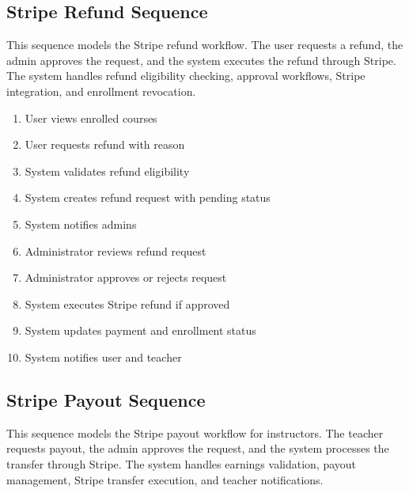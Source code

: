 
\subsection{Stripe Refund Sequence}
This sequence models the Stripe refund workflow. The user requests a refund,
the admin approves the request, and the system executes the refund through
Stripe. The system handles refund eligibility checking, approval workflows,
Stripe integration, and enrollment revocation.

\begin{enumerate}[topsep=0pt,itemsep=1pt,parsep=0pt,partopsep=0pt]
    \item User views enrolled courses
    \item User requests refund with reason
    \item System validates refund eligibility
    \item System creates refund request with pending status
    \item System notifies admins
    \item Administrator reviews refund request
    \item Administrator approves or rejects request
    \item System executes Stripe refund if approved
    \item System updates payment and enrollment status
    \item System notifies user and teacher
\end{enumerate}


\subsection{Stripe Payout Sequence}
This sequence models the Stripe payout workflow for instructors. The teacher
requests payout, the admin approves the request, and the system processes the
transfer through Stripe. The system handles earnings validation, payout
management, Stripe transfer execution, and teacher notifications.

